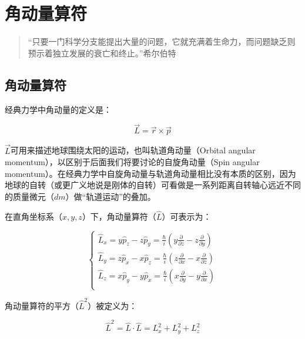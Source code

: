 \section{角动量算符}

\begin{quotation}
``只要一门科学分支能提出大量的问题，它就充满着生命力，而问题缺乏则预示着独立发展的衰亡和终止。''\qquad 希尔伯特
\end{quotation}

\subsection{角动量算符}

经典力学中角动量的定义是：

\begin{equation}\label{classical angular momentum}
\vec L = \vec r \times \vec p
\end{equation}

$\vec L$可用来描述地球围绕太阳的运动，也叫轨道角动量（Orbital angular momentum），以区别于后面我们将要讨论的自旋角动量（Spin angular momentum）。在经典力学中自旋角动量与轨道角动量相比没有本质的区别，因为地球的自转（或更广义地说是刚体的自转）可看做是一系列距离自转轴心远近不同的质量微元（$dm$）做“轨道运动”的叠加。


在直角坐标系（$x, y, z$）下，角动量算符（$\hat L$）可表示为：

\begin{equation}
\left\{ \begin{array}{l}
 \widehat L_x  = y\widehat p_z  - z\widehat p_y  = \frac{\hbar }{i}\left( {y\frac{\partial }{{\partial z}} - z\frac{\partial }{{\partial y}}} \right) \\
 \widehat L_y  = z\widehat p_x  - x\widehat p_z  = \frac{\hbar }{i}\left( {z\frac{\partial }{{\partial x}} - x\frac{\partial }{{\partial z}}} \right) \\
 \widehat L_z  = x\widehat p_y  - y\widehat p_x  = \frac{\hbar }{i}\left( {x\frac{\partial }{{\partial y}} - y\frac{\partial }{{\partial x}}} \right) \\
 \end{array} \right.
\end{equation}

角动量算符的平方（$\hat L^2$）被定义为：

\begin{equation}
\hat L^2 =\hat L \cdot \hat L = L_x^2 + L_y^2 + L_z^2 
\end{equation}

